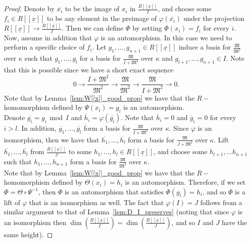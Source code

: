 \documentclass{article}
\numberwithin{theorem}{section}
\renewcommand{\mod}{\,\operatorname{mod}\,}
\begin{document}
\begin{proof}
    Denote by $\overline{x_i}$ to be the image of $x_i$ in $\frac{R[[\underline{x}]]}{I}$, and choose some $f_i \in R[[\underline{x}]]$ to be any element in the preimage of $\varphi(\overline{x_i})$ under the projection $R[[\underline{x}]] \to \frac{R[[\underline{x}]]}{J}$. Then we can define $\Phi$ by setting $\Phi(x_i) = f_i$ for every $i$.\\
    
    Now, assume in addition that $\varphi$ is an automorphism. In this case we need to perform a specific choice of $f_i$. Let $g_1, \dots, g_{n+1} \in R[[\underline{x}]]$ induce a basis for $\frac{\mathfrak{M}}{\mathfrak{M}^2}$ over $\kappa$ such that $g_1, \dots, g_l$ for a basis for $\frac{\mathfrak{M}}{I+\mathfrak{M}^2}$ over $\kappa$ and $g_{l+1}, \dots, g_{n+1}\in I$. Note that this is possible since we have a short exact sequence 
    \begin{equation*}
        0 \to \frac{I+\mathfrak{M}^2}{\mathfrak{M}^2} \to \frac{\mathfrak{M}}{\mathfrak{M}^2} \to \frac{\mathfrak{M}}{I+\mathfrak{M}^2} \to 0.
    \end{equation*}
    Note that by Lemma~\ref{lem:W[[x]]_good_prop} we have that the $R-$homomorphism defined by $\Psi(x_i)=g_i$ is an automorphism. \\ 

    Denote $\overline{g_i}=g_i \mod I$ and $\overline{h}_i=\varphi(\overline{g_i})$. Note that $\overline{h}_i=0$ and $\overline{g}_i=0$ for every $i > l$. In addition, $\overline{g_1}, \dots, \overline{g_l}$ form a basis for $\frac{\mathfrak{M}}{I+\mathfrak{M}^2}$ over $\kappa$. Since $\varphi$ is an isomorphism, then we have that $\overline{h_1}, \dots, \overline{h_l}$ form a basis for $\frac{\mathfrak{M}}{J+\mathfrak{M}^2}$ over $\kappa$. Lift $\overline{h_1}, \dots, \overline{h_l}$ from $\frac{R[[\underline{x}]]}{J}$ to some $h_1, \dots, h_l \in R[[\underline{x}]]$, and choose some $h_{l+1}, \dots h_{n+1}$ such that $h_1, \dots, h_{n+1}$ form a basis for $\frac{\mathfrak{M}}{\mathfrak{M}^2}$ over $\kappa$. \\

    Note that by Lemma~\ref{lem:W[[x]]_good_prop} we have that the $R-$homomorphism defined by $\Theta(x_i)=h_i$ is an automorphism. Therefore, if we set $\Phi=\Theta \circ \Psi^{-1}$, then $\Phi$ is an automorphism that satisfies $\Phi(g_i)=h_i$, and so $\Phi$ is a lift of $\varphi$ that is an isomorphism as well. The fact that $\varphi(I)=J$ follows from a similar argument to that of Lemma~\ref{lem:D_I_preserves} (noting that since $\varphi$ is an isomorphism then $\dim\left(\frac{R[[\underline{x}]]}{I}\right) = \dim\left(\frac{R[[\underline{x}]]}{J}\right)$, and so $I$ and $J$ have the same height). 
\end{proof}
\end{document}
